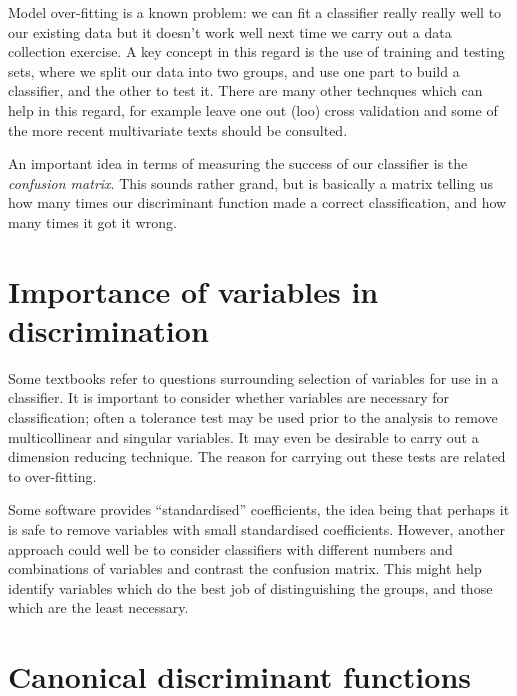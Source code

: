 Model over-fitting is a known problem: we can fit a classifier really really well to our existing data but it doesn't work well next time we carry out a data collection exercise.   A key concept in this regard is the use of training and testing sets, where we split our data into two groups, and use one part to build a classifier, and the other to test it.   There are many other technques which can help in this regard, for example leave one out (loo) cross validation and some of the more recent multivariate texts should be consulted.

An important idea in terms of measuring the success of our classifier is the \emph{confusion matrix}.   This sounds rather grand, but is basically a matrix telling us how many times our discriminant function made a correct classification, and how many times it got it wrong.

\section{Importance of variables in discrimination}
\label{imporvar}

Some textbooks refer to questions surrounding selection of variables for use in a classifier.   It is important to consider whether variables are necessary for classification; often a tolerance test may be used prior to the analysis to remove multicollinear and singular variables.   It may even be desirable to carry out a dimension reducing technique.   The reason for carrying out these tests are related to over-fitting.

Some software provides ``standardised'' coefficients, the idea being that perhaps it is safe to remove variables with small standardised coefficients.   However, another approach could well be to consider classifiers with different numbers and combinations of variables and contrast the confusion matrix.   This might help identify variables which do the best job of distinguishing the groups, and those which are the least necessary.


\section{Canonical discriminant functions}
\label{candisc}

